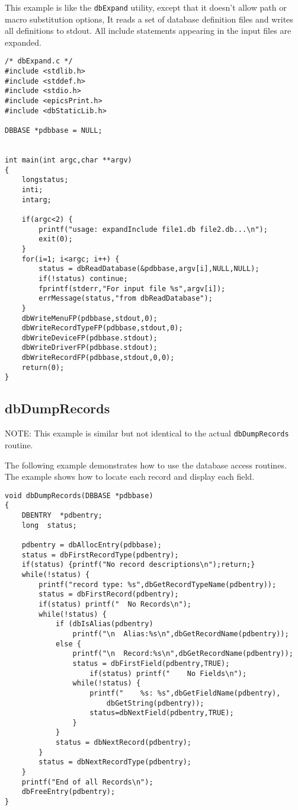 This example is like the \verb|dbExpand| utility, except that it doesn't allow path or macro substitution options, It reads a set of 
database definition files and writes all definitions to stdout. All include statements appearing in the input files are 
expanded.

\begin{verbatim}/* dbExpand.c */
#include <stdlib.h>
#include <stddef.h>
#include <stdio.h>
#include <epicsPrint.h>
#include <dbStaticLib.h>

DBBASE *pdbbase = NULL;


int main(int argc,char **argv)
{
    longstatus;
    inti;
    intarg;
 
    if(argc<2) {
        printf("usage: expandInclude file1.db file2.db...\n");
        exit(0);
    }
    for(i=1; i<argc; i++) {
        status = dbReadDatabase(&pdbbase,argv[i],NULL,NULL);
        if(!status) continue;
        fprintf(stderr,"For input file %s",argv[i]);
        errMessage(status,"from dbReadDatabase");
    }
    dbWriteMenuFP(pdbbase,stdout,0);
    dbWriteRecordTypeFP(pdbbase,stdout,0);
    dbWriteDeviceFP(pdbbase.stdout);
    dbWriteDriverFP(pdbbase.stdout);
    dbWriteRecordFP(pdbbase,stdout,0,0);
    return(0);
}

\end{verbatim}\subsection{dbDumpRecords}

NOTE: This example is similar but not identical to the actual \verb|dbDumpRecords| routine.

The following example demonstrates how to use the database access routines. The example shows how to locate each 
record and display each field.

\begin{verbatim}
void dbDumpRecords(DBBASE *pdbbase)
{
    DBENTRY  *pdbentry;
    long  status;

    pdbentry = dbAllocEntry(pdbbase);
    status = dbFirstRecordType(pdbentry);
    if(status) {printf("No record descriptions\n");return;}
    while(!status) {
        printf("record type: %s",dbGetRecordTypeName(pdbentry));
        status = dbFirstRecord(pdbentry);
        if(status) printf("  No Records\n"); 
        while(!status) {
            if (dbIsAlias(pdbentry)
                printf("\n  Alias:%s\n",dbGetRecordName(pdbentry));
            else {
                printf("\n  Record:%s\n",dbGetRecordName(pdbentry));
                status = dbFirstField(pdbentry,TRUE);
                    if(status) printf("    No Fields\n");
                while(!status) {
                    printf("    %s: %s",dbGetFieldName(pdbentry),
                        dbGetString(pdbentry));
                    status=dbNextField(pdbentry,TRUE);
                }
            }
            status = dbNextRecord(pdbentry);
        }
        status = dbNextRecordType(pdbentry);
    }
    printf("End of all Records\n");
    dbFreeEntry(pdbentry);
}
\end{verbatim}
